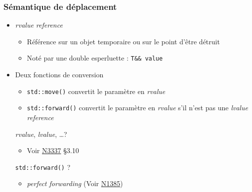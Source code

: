 \documentclass[C++.tex]{subfiles}
\begin{document}
\begin{frame}[fragile]
	\frametitle{Sémantique de déplacement}
	\begin{itemize}
		\item \textit{rvalue reference}
		\begin{itemize}
			\item Référence sur un objet temporaire ou sur le point d'être détruit
			\item Noté par une double esperluette : \lstinline|T&& value|
		\end{itemize}
		\item Deux fonctions \og de conversion\fg{}
		\begin{itemize}
			\item \lstinline|std::move()| convertit le paramètre en \textit{rvalue}


			\item \lstinline|std::forward()| convertit le paramètre en \textit{rvalue} s'il n'est pas une \textit{lvalue reference}
		\end{itemize}

		\begin{block}{\textit{rvalue}, \textit{lvalue}, \ldots ?}
			\begin{itemize}
				\item Voir \href{http://www.open-std.org/jtc1/sc22/wg21/docs/papers/2012/n3337.pdf}{N3337} §3.10
			\end{itemize}
		\end{block}

		\begin{block}{\lstinline|std::forward()| ?}
			\begin{itemize}
				\item \textit{perfect forwarding} (Voir \href{http://www.open-std.org/jtc1/sc22/wg21/docs/papers/2002/n1385.htm}{N1385})
			\end{itemize}
		\end{block}
	\end{itemize}
\end{frame}
\end{document}
